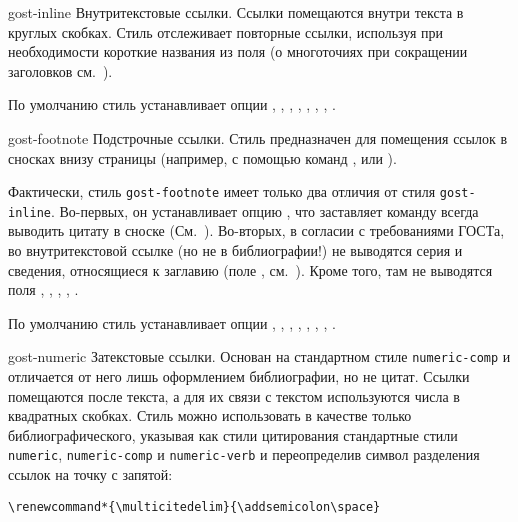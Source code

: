 \documentclass[10pt,a4paper,headings=small,numbers=enddot,english,russian]{ltxdockit}[2011/03/25]
\newcommand*{\bibsty}{\texttt}
\renewcommand*{\tabref}{\refs{табл.}{табл.}}
\begin{document}
\begin{marglist}

\item[gost-inline]
Внутритекстовые ссылки. Ссылки помещаются внутри текста в круглых скобках.
Стиль отслеживает
повторные ссылки, используя при необходимости короткие названия из поля
 (о многоточиях при сокращении заголовков
см.~).

По умолчанию стиль устанавливает опции , ,
 , , ,
, ,
.

\item[gost-footnote]
Подстрочные ссылки.
Стиль предназначен для помещения ссылок в сносках внизу страницы (например, с помощью
команд ,  или ).

Фактически, стиль \bibsty{gost-footnote} имеет только два отличия от стиля
\bibsty{gost-inline}.
Во-первых, он устанавливает опцию , что заставляет команду
 всегда выводить цитату в сноске
(См.~). Во-вторых, в согласии с требованиями ГОСТа,
во внутритекстовой ссылке (но не
в библиографии!) не выводятся серия и сведения, относящиеся
к заглавию (поле , см.~\tabref{tab:gost-biblatex}). Кроме того,
там не выводятся поля ,
, , , .

По умолчанию стиль устанавливает опции , ,
, , ,
, ,
.

\item[gost-numeric]
Затекстовые ссылки. Основан на стандартном стиле \bibsty{numeric-comp} и отличается
от него лишь оформлением библиографии, но не цитат. Ссылки помещаются после текста,
а для их связи с текстом используются числа в квадратных скобках. Стиль можно использовать
в качестве только
библиографического, указывая как стили цитирования стандартные стили \bibsty{numeric},
\bibsty{numeric-comp} и \bibsty{numeric-verb} и переопределив символ разделения ссылок на
точку с запятой:

\begin{lstlisting}[style=latex]
\renewcommand*{\multicitedelim}{\addsemicolon\space}
\end{lstlisting}


\end{marglist}
\end{document}
